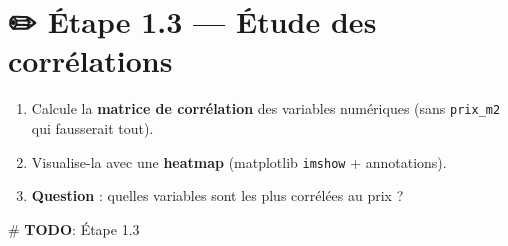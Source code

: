 \documentclass[
  french,
  11pt,
  a4paper,
]{scrbook}
\newenvironment{Shaded}{}{}
\newcommand{\AlertTok}[1]{\textcolor[rgb]{1.00,0.33,0.33}{\textbf{#1}}}
\newcommand{\CommentTok}[1]{\textcolor[rgb]{0.42,0.45,0.49}{#1}}
\providecommand{\tightlist}{%
  \setlength{\itemsep}{0pt}\setlength{\parskip}{0pt}}
\begin{document}
\section{✏️ Étape 1.3 --- Étude des
corrélations}\label{uxe9tape-1.3-uxe9tude-des-corruxe9lations}

\begin{tcolorbox}[enhanced jigsaw, arc=.35mm, bottomrule=.15mm, bottomtitle=1mm, breakable, colback=white, colbacktitle=quarto-callout-note-color!10!white, colframe=quarto-callout-note-color-frame, coltitle=black, left=2mm, leftrule=.75mm, opacityback=0, opacitybacktitle=0.6, rightrule=.15mm, title={📝 À faire}, titlerule=0mm, toprule=.15mm, toptitle=1mm]

\begin{enumerate}
\def\labelenumi{\arabic{enumi}.}
\tightlist
\item
  Calcule la \textbf{matrice de corrélation} des variables numériques
  (sans \texttt{prix\_m2} qui fausserait tout).
\item
  Visualise-la avec une \textbf{heatmap} (matplotlib \texttt{imshow} +
  annotations).
\item
  \textbf{Question} : quelles variables sont les plus corrélées au prix
  ?
\end{enumerate}

\end{tcolorbox}

\begin{Shaded}
\begin{Highlighting}[]
\CommentTok{\# }\AlertTok{TODO}\CommentTok{: Étape 1.3}
\end{Highlighting}
\end{Shaded}
\end{document}
